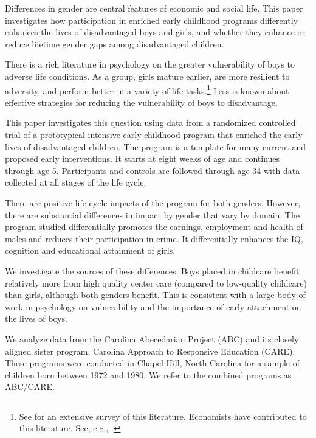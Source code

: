 Differences in gender are central features of economic and social life. This paper investigates how participation in enriched early childhood programs differently enhances the lives of disadvantaged boys and girls, and whether they enhance or reduce lifetime gender gaps among disadvantaged children.

There is a rich literature in psychology on the greater vulnerability of boys to adverse life conditions. As a group, girls mature earlier, are more resilient to adversity, and perform better in a variety of life tasks.\footnote{See \cite{Schore_2017_IMHJ} for an extensive survey of this literature. Economists have contributed to this literature. See, e.g., \cite{Autor-etal_2015_Family-Disadvantage}.} Less is known about effective strategies for reducing the vulnerability of boys to disadvantage. 

This paper investigates this question using data from a randomized controlled trial of a prototypical intensive early childhood program that enriched the early lives of disadvantaged children. The program is a template for many current and proposed early interventions. It starts at eight weeks of age and continues through age 5. Participants and controls are followed through age 34 with data collected at all stages of the life cycle.

There are positive life-cycle impacts of the program for both genders. However, there are substantial differences in impact by gender that vary by domain. The program studied differentially promotes the earnings, employment and health of males and reduces their participation in crime. It differentially enhances the IQ, cognition and educational attainment of girls. 

We investigate the sources of these differences. Boys placed in childcare benefit relatively more from high quality center care (compared to low-quality childcare) than girls, although both genders benefit. This is consistent with a large body of work in psychology on vulnerability and the importance of early attachment on the lives of boys. 

We analyze data from the Carolina Abecedarian Project (ABC) and its closely aligned sister program, Carolina Approach to Responsive Education (CARE). These programs were conducted in Chapel Hill, North Carolina for a sample of children born between 1972 and 1980. We refer to the combined programs as ABC/CARE.

